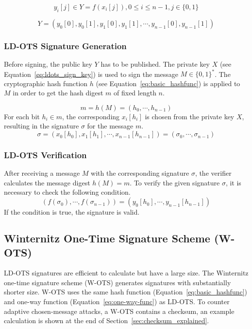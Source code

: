 \begin{equation}
y_i[j] \in Y = f(x_i[j]), 0 \leq i \leq n-1, j \in \lbrace 0,1 \rbrace
\end{equation}

\begin{equation}
Y = \left( 
y_{0}\left[0\right], y_{0}\left[1 \right], y_{1}\left[0\right], y_{1}\left[1\right], \cdots, y_{n-1}\left[0\right], y_{n-1}\left[1\right]
\right)
\end{equation}

\subsubsection{LD-OTS Signature Generation} %
Before signing, the public key $Y$ has to be published.
The private key $X$ (see Equation~\ref{eq:ldots_sign_key}) is used to sign the message $M \in \lbrace 0,1 \rbrace^*$. 
The cryptographic hash function $h$ (see Equation~\ref{eq:basic_hashfunc}) is applied to $M$ in order to get the hash digest $m$ of fixed length $n$.

\begin{equation}
\label{eq:hash_message}
m = h(M) = (h_{0}, \cdots, h_{n-1})
\end{equation} %
For each bit $h_i \in m$, the corresponding $x_i[h_i]$ is chosen from the private key $X$, resulting in the signature $\sigma$ for the message $m$.
\begin{equation}
\sigma = \left(
x_0 \left[ h_0 \right], x_1\left[ h_1 \right], \cdots, x_{n-1}\left[ h_{n-1}\right]
\right) = (\sigma_0, \cdots, \sigma_{n-1})
\end{equation}

\subsubsection{LD-OTS Verification}
After receiving a message $M$ with the corresponding signature $\sigma$, the verifier calculates the message digest $h(M) = m$. 
To verify the given signature $\sigma$, it is necessary to check the following condition.
\begin{equation}
\left(
f(\sigma_0), \cdots, f(\sigma_{n-1})
\right) =
\left(
y_0[h_0], \cdots, y_{n-1}[h_{n-1}]
\right)
\end{equation}
If the condition is true, the signature is valid.

\subsection{Winternitz One-Time Signature Scheme (W-OTS)}
\label{sec:wots_general}
LD-OTS signatures are efficient to calculate but have a large size.
The Winternitz one-time signature scheme (W-OTS) generates signatures with substantially shorter size. W-OTS uses the same hash function (Equation~\ref{eq:basic_hashfunc}) and one-way function (Equation~\ref{eq:one-way-func}) as LD-OTS. To counter adaptive chosen-message attacks, a W-OTS contains a checksum, an example calculation is shown at the end of Section~\ref{sec:checksum_explained}.

